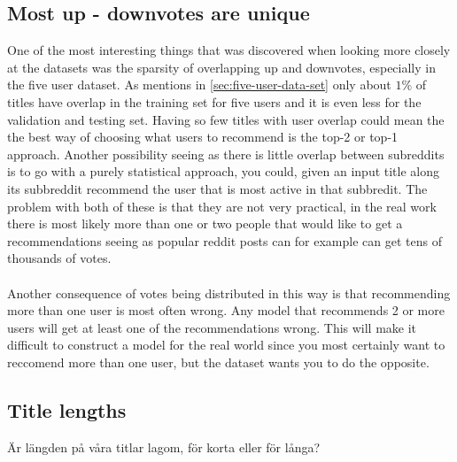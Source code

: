\subsection{Most up - downvotes are unique}
One of the most interesting things that was discovered when looking more closely at the datasets was the sparsity of overlapping up and downvotes, especially in the five user dataset. As mentions in \ref{sec:five-user-data-set} only about $1\%$ of titles have overlap in the training set for five users and it is even less for the validation and testing set. Having so few titles with user overlap could mean the the best way of choosing what users to recommend is the top-2 or top-1 approach. Another possibility seeing as there is little overlap between subreddits is to go with a purely statistical approach, you could, given an input title along its subbreddit recommend the user that is most active in that subbredit. The problem with both of these is that they are not very practical, in the real work there is most likely more than one or two people that would like to get a recommendations seeing as popular reddit posts can for example can get tens of thousands of votes.\\\\

Another consequence of votes being distributed in this way is that recommending more than one user is most often wrong. Any model that recommends 2 or more users will get at least one of the recommendations wrong. This will make it difficult to construct a model for the real world since you most certainly want to reccomend more than one user, but the dataset wants you to do the opposite.
\subsection{Title lengths}
Är längden på våra titlar lagom, för korta eller för långa?
